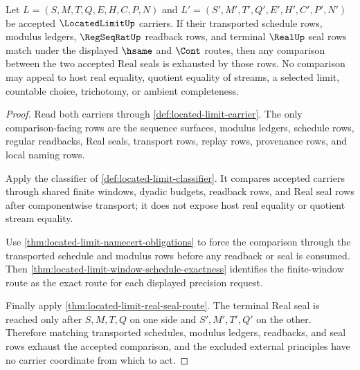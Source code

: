 \begin{theorem}
\label{thm:located-limit-real-seal-comparison}
Let $L=(S,M,T,Q,E,H,C,P,N)$ and $L'=(S',M',T',Q',E',H',C',P',N')$ be accepted $\LocatedLimitUp$ carriers. If their transported schedule rows, modulus ledgers, $\RegSeqRatUp$ readback rows, and terminal $\RealUp$ seal rows match under the displayed $\hsame$ and $\Cont$ routes, then any comparison between the two accepted Real seals is exhausted by those rows. No comparison may appeal to host real equality, quotient equality of streams, a selected limit, countable choice, trichotomy, or ambient completeness.
\end{theorem}
\begin{proof}
Read both carriers through \autoref{def:located-limit-carrier}. The only comparison-facing rows are the sequence surfaces, modulus ledgers, schedule rows, regular readbacks, Real seals, transport rows, replay rows, provenance rows, and local naming rows.

Apply the classifier of \autoref{def:located-limit-classifier}. It compares accepted carriers through shared finite windows, dyadic budgets, readback rows, and Real seal rows after componentwise transport; it does not expose host real equality or quotient stream equality.

Use \autoref{thm:located-limit-namecert-obligations} to force the comparison through the transported schedule and modulus rows before any readback or seal is consumed. Then \autoref{thm:located-limit-window-schedule-exactness} identifies the finite-window route as the exact route for each displayed precision request.

Finally apply \autoref{thm:located-limit-real-seal-route}. The terminal Real seal is reached only after $S,M,T,Q$ on one side and $S',M',T',Q'$ on the other. Therefore matching transported schedules, modulus ledgers, readbacks, and seal rows exhaust the accepted comparison, and the excluded external principles have no carrier coordinate from which to act.
\end{proof}

